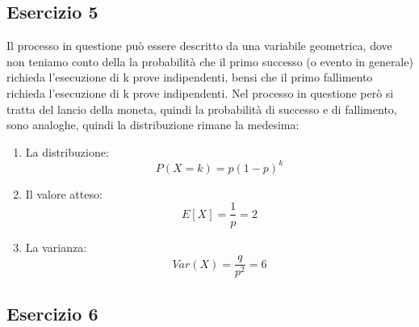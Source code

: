 \documentclass[12pt]{article}
\begin{document}
\subsection*{Esercizio 5}
Il processo in questione può essere descritto da una variabile geometrica, dove non teniamo conto della la probabilità 
che il primo successo (o evento in generale) richieda l'esecuzione di k prove indipendenti, bensi che il primo fallimento richieda l'esecuzione
di k prove indipendenti. Nel processo in questione però si tratta del lancio della moneta, quindi la probabilità di successo e di fallimento,
sono analoghe, quindi la distribuzione rimane la medesima:
\begin{enumerate}
    \item La distribuzione:
    \[
    P(X = k) = p(1-p)^k    
    \]
    \item Il valore atteso:
    \[
    E[X] = \frac{1}{p} = 2    
    \]
    \item La varianza:
    \[
    Var(X) = \frac{q}{p^2} = 6     
    \]
\end{enumerate}

\subsection*{Esercizio 6}
\end{document}
